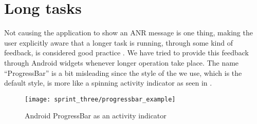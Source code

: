 \section{Long tasks}

Not causing the application to show an ANR message is one thing, making the user explicitly aware that a longer task is running, through some kind of feedback, is considered good practice \parencite{benyon}. We have tried to provide this feedback through Android  widgets whenever longer operation take place. The name ``ProgressBar'' is a bit misleading since the style of the  we use, which is the default style, is more like a spinning activity indicator as seen in . 

\begin{figure}[!htbp]
        \centering
        \texttt{[image: sprint\_three/progressbar\_example]}
        \caption{Android ProgressBar as an activity indicator}
        \label{fig:activity_indicator}
\end{figure}